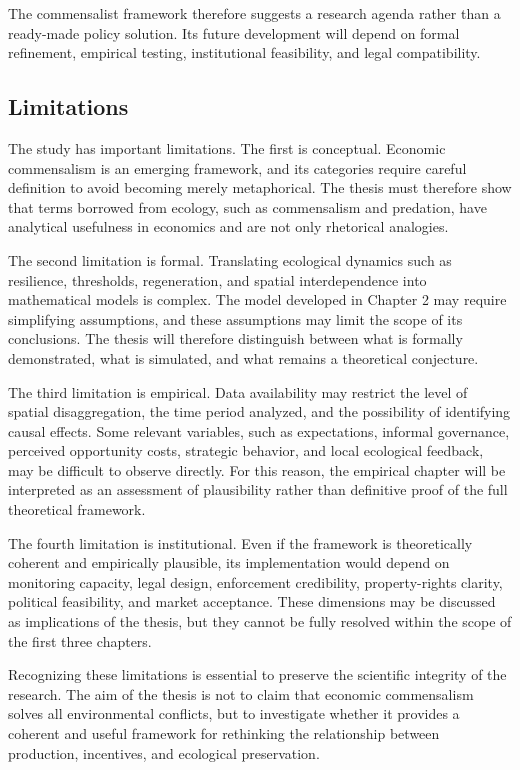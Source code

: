 The commensalist framework therefore suggests a research agenda rather than a ready-made policy solution. Its future development will depend on formal refinement, empirical testing, institutional feasibility, and legal compatibility.

\subsection{Limitations}

The study has important limitations. The first is conceptual. Economic commensalism is an emerging framework, and its categories require careful definition to avoid becoming merely metaphorical. The thesis must therefore show that terms borrowed from ecology, such as commensalism and predation, have analytical usefulness in economics and are not only rhetorical analogies.

The second limitation is formal. Translating ecological dynamics such as resilience, thresholds, regeneration, and spatial interdependence into mathematical models is complex. The model developed in Chapter 2 may require simplifying assumptions, and these assumptions may limit the scope of its conclusions. The thesis will therefore distinguish between what is formally demonstrated, what is simulated, and what remains a theoretical conjecture.

The third limitation is empirical. Data availability may restrict the level of spatial disaggregation, the time period analyzed, and the possibility of identifying causal effects. Some relevant variables, such as expectations, informal governance, perceived opportunity costs, strategic behavior, and local ecological feedback, may be difficult to observe directly. For this reason, the empirical chapter will be interpreted as an assessment of plausibility rather than definitive proof of the full theoretical framework.

The fourth limitation is institutional. Even if the framework is theoretically coherent and empirically plausible, its implementation would depend on monitoring capacity, legal design, enforcement credibility, property-rights clarity, political feasibility, and market acceptance. These dimensions may be discussed as implications of the thesis, but they cannot be fully resolved within the scope of the first three chapters.

Recognizing these limitations is essential to preserve the scientific integrity of the research. The aim of the thesis is not to claim that economic commensalism solves all environmental conflicts, but to investigate whether it provides a coherent and useful framework for rethinking the relationship between production, incentives, and ecological preservation.

\newpage


